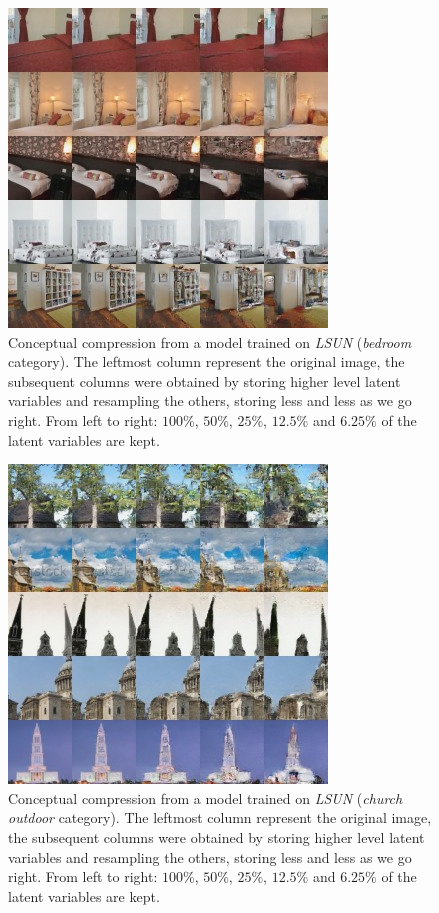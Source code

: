 \documentclass{article}
\begin{document}
\begin{figure}[H]
    \centering \includegraphics[width=.5\textwidth]{bedroom_compression.jpg}
    \caption{Conceptual compression from a model trained on \emph{LSUN} (\emph{bedroom} category). The leftmost column represent the original image, the subsequent columns were obtained by storing higher level latent variables and resampling the others, storing less and less as we go right. From left to right: $100\%$, $50\%$, $25\%$, $12.5\%$ and $6.25\%$ of the latent variables are kept.}
\end{figure}

\begin{figure}[H]
    \centering \includegraphics[width=.5\textwidth]{church_compression.jpg}
    \caption{Conceptual compression from a model trained on \emph{LSUN} (\emph{church outdoor} category). The leftmost column represent the original image, the subsequent columns were obtained by storing higher level latent variables and resampling the others, storing less and less as we go right. From left to right: $100\%$, $50\%$, $25\%$, $12.5\%$ and $6.25\%$ of the latent variables are kept.}
\end{figure}
\end{document}
